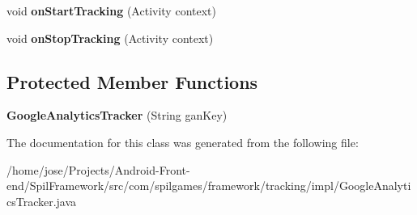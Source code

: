 \begin{DoxyCompactItemize}
\item 
\hypertarget{classcom_1_1spilgames_1_1framework_1_1tracking_1_1impl_1_1_google_analytics_tracker_a5cb99451323fc1a0d1a7c2cca5ca4167}{void {\bfseries on\-Start\-Tracking} (Activity context)}\label{classcom_1_1spilgames_1_1framework_1_1tracking_1_1impl_1_1_google_analytics_tracker_a5cb99451323fc1a0d1a7c2cca5ca4167}

\item 
\hypertarget{classcom_1_1spilgames_1_1framework_1_1tracking_1_1impl_1_1_google_analytics_tracker_a14b9fa77933825044d9a7bc856b1fbba}{void {\bfseries on\-Stop\-Tracking} (Activity context)}\label{classcom_1_1spilgames_1_1framework_1_1tracking_1_1impl_1_1_google_analytics_tracker_a14b9fa77933825044d9a7bc856b1fbba}

\end{DoxyCompactItemize}
\subsection*{Protected Member Functions}
\begin{DoxyCompactItemize}
\item 
\hypertarget{classcom_1_1spilgames_1_1framework_1_1tracking_1_1impl_1_1_google_analytics_tracker_af16d9e9a712ac4f2b4def8aa5ed7dca5}{{\bfseries Google\-Analytics\-Tracker} (String gan\-Key)}\label{classcom_1_1spilgames_1_1framework_1_1tracking_1_1impl_1_1_google_analytics_tracker_af16d9e9a712ac4f2b4def8aa5ed7dca5}

\end{DoxyCompactItemize}


The documentation for this class was generated from the following file\-:\begin{DoxyCompactItemize}
\item 
/home/jose/\-Projects/\-Android-\/\-Front-\/end/\-Spil\-Framework/src/com/spilgames/framework/tracking/impl/Google\-Analytics\-Tracker.\-java\end{DoxyCompactItemize}
